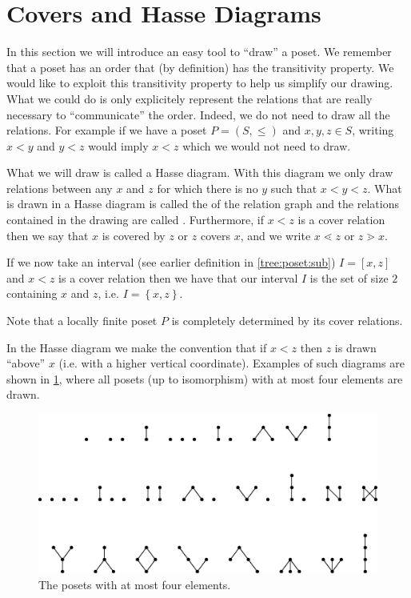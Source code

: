 \section{Covers and Hasse Diagrams}
\label{tree:poset:hasse}


In this section we will introduce an easy tool to ``draw'' a poset. We remember
that a poset has an order that (by definition) has the transitivity property.
We would like to exploit this transitivity property to help us simplify our
drawing. What we could do is only explicitely represent the relations that are
really necessary to ``communicate'' the order. Indeed, we do not need to draw
all the relations. For example if we have a poset $P = (S, \le)$ and $x, y, z
\in S$, writing $x < y$ and $y < z$ would imply $x < z$ which we would not need
to draw.


What we will draw is called a Hasse diagram. With this diagram we only draw
relations between any $x$ and $z$ for which there is no $y$ such that $x < y <
z$.
What is drawn in a Hasse diagram is called the 
of the relation graph and the relations contained in the drawing are called
. Furthermore, if $x < z$ is a cover relation then we
say that $x$ is covered by $z$ or $z$ covers $x$, and we write $x \lessdot z$
or $z \gtrdot x$.


If we now take an interval (see earlier definition in \ref{tree:poset:sub}) $I
= [x, z]$ and $x < z$ is a cover relation then we have that our interval $I$ is
the set of size $2$ containing $x$ and $z$, i.e. $I = \left\{{x, z}\right\}$.

Note that a locally finite poset $P$ is completely determined by its cover
relations.

In the Hasse diagram we make the convention that if $x < z$ then $z$ is drawn
``above'' $x$ (i.e. with a higher vertical coordinate). Examples of such
diagrams are shown in \ref{fig:stanley:3-1}, where all posets (up to
isomorphism) with at most four elements are drawn.


\begin{figure}
	\centering
	\includegraphics[width=\textwidth]{fig/stanley/3-1}
	\caption{\label{fig:stanley:3-1} The posets with at most four elements.
\cite{Stanley:2011:ECV:2124415}}
\end{figure}


